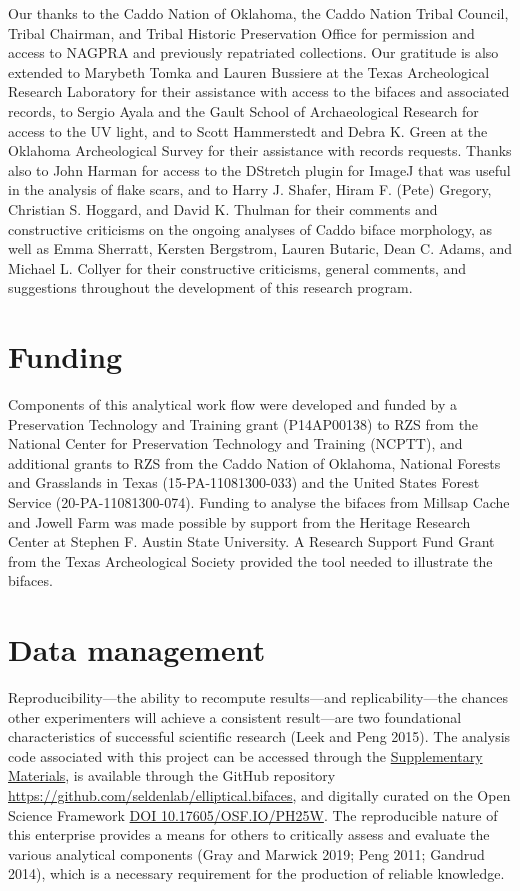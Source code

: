 \documentclass[]{interact}
\theoremstyle{plain}%
\theoremstyle{definition}
\theoremstyle{remark}
\begin{document}
Our thanks to the Caddo Nation of Oklahoma, the Caddo Nation Tribal
Council, Tribal Chairman, and Tribal Historic Preservation Office for
permission and access to NAGPRA and previously repatriated collections.
Our gratitude is also extended to Marybeth Tomka and Lauren Bussiere at
the Texas Archeological Research Laboratory for their assistance with
access to the bifaces and associated records, to Sergio Ayala and the
Gault School of Archaeological Research for access to the UV light, and
to Scott Hammerstedt and Debra K. Green at the Oklahoma Archeological
Survey for their assistance with records requests. Thanks also to John
Harman for access to the DStretch plugin for ImageJ that was useful in
the analysis of flake scars, and to Harry J. Shafer, Hiram F. (Pete)
Gregory, Christian S. Hoggard, and David K. Thulman for their comments
and constructive criticisms on the ongoing analyses of Caddo biface
morphology, as well as Emma Sherratt, Kersten Bergstrom, Lauren Butaric,
Dean C. Adams, and Michael L. Collyer for their constructive criticisms,
general comments, and suggestions throughout the development of this
research program.

\hypertarget{funding}{%
\section*{Funding}\label{funding}}

Components of this analytical work flow were developed and funded by a
Preservation Technology and Training grant (P14AP00138) to RZS from the
National Center for Preservation Technology and Training (NCPTT), and
additional grants to RZS from the Caddo Nation of Oklahoma, National
Forests and Grasslands in Texas (15-PA-11081300-033) and the United
States Forest Service (20-PA-11081300-074). Funding to analyse the
bifaces from Millsap Cache and Jowell Farm was made possible by support
from the Heritage Research Center at Stephen F. Austin State University.
A Research Support Fund Grant from the Texas Archeological Society
provided the tool needed to illustrate the bifaces.

\hypertarget{data-management}{%
\section{Data management}\label{data-management}}

Reproducibility---the ability to recompute results---and
replicability---the chances other experimenters will achieve a
consistent result---are two foundational characteristics of successful
scientific research (Leek and Peng 2015). The analysis code associated
with this project can be accessed through the
\href{https://seldenlab.github.io/elliptical.bifaces/}{Supplementary
Materials}, is available through the GitHub repository
\url{https://github.com/seldenlab/elliptical.bifaces}, and digitally
curated on the Open Science Framework \href{https://osf.io/ph25w/}{DOI
10.17605/OSF.IO/PH25W}. The reproducible nature of this enterprise
provides a means for others to critically assess and evaluate the
various analytical components (Gray and Marwick 2019; Peng 2011; Gandrud
2014), which is a necessary requirement for the production of reliable
knowledge.
\end{document}
